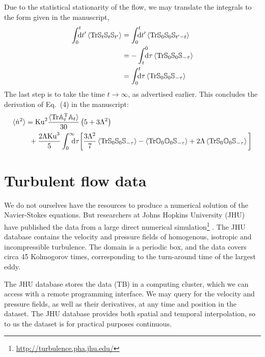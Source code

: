 \documentclass[thesis.tex]{subfiles}
\begin{document}
Due to the statistical stationarity of the flow, we may translate the integrals to the form given in the manuscript, 
\begin{align*}
	\int_0^{t}\!\!\!\!{\rm d}t'\left\langle\tr \ma S_t\ma S_{t}\ma S_{t'}\right\rangle 
	&= \int_0^{t}\!\!\!\!{\rm d}t'\left\langle\tr \ma S_0\ma S_{0}\ma S_{t'-t}\right\rangle \\
	&= -\int_t^{0}\!\!\!\!{\rm d}\tau\left\langle\tr \ma S_0\ma S_{0}\ma S_{-\tau}\right\rangle \\
	&= \int_0^{t}\!\!\!\!{\rm d}\tau\left\langle\tr \ma S_0\ma S_{0}\ma S_{-\tau}\right\rangle
\end{align*}
The last step is to take the time $t\to\infty$, as advertised earlier. This concludes the derivation of Eq.~(4) in the manuscript:
\begin{align*}
\langle \dot n^2\rangle &=\mbox{Ku}^2\frac{\langle\mbox{Tr}\mathbb{A}_t^{\mathrm T} \mathbb{A}_t\rangle}{30}\left(5 + 3 \Lambda^2\right) \\
	&\,\,\,+ \frac{2 \Lambda\mbox{Ku}^3}{5} \int_0^{\infty}\!\!\!\!{\rm d}\tau \bigg[\frac{3 \Lambda^2}{7}\left\langle\mbox{Tr} \mathbb{S}_0\mathbb{S}_{0}\mathbb{S}_{-\tau}\right\rangle - \left\langle\mbox{Tr} \mathbb{O}_0\mathbb{O}_{0}\mathbb{S}_{-\tau}\right\rangle + 2 \Lambda\left\langle\mbox{Tr} \mathbb{S}_0\mathbb{O}_{0}\mathbb{S}_{-\tau}\right\rangle\bigg]
\end{align*}


\section{Turbulent flow data}

We do not ourselves have the resources to produce a numerical solution of the Navier-Stokes equations. But researchers at Johns Hopkins University (JHU) have published the data from a large direct numerical simulation\footnote{\url{http://turbulence.pha.jhu.edu/}} \cite{li2008}. The JHU database contains the velocity and pressure fields of homogenous, isotropic and incompressible turbulence. The domain is a periodic box, and the data covers circa 45 Kolmogorov times, corresponding to the turn-around time of the largest eddy. 

The JHU database stores the data (\unit[27]{TB}) in a computing cluster, which we can access with a remote programming interface. We may query for the velocity and pressure fields, as well as their derivatives, at any time and position in the dataset. The JHU database provides both spatial and temporal interpolation, so to us the dataset is for practical purposes continuous.
\end{document}
